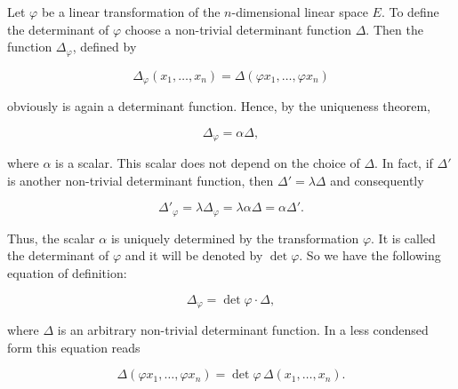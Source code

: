 Let $\varphi$ be a linear transformation of the $n$-dimensional linear space $E$. To define the determinant of $\varphi$ choose a non-trivial determinant function $\Delta$. Then the function $\Delta_\varphi$, defined by

$$\Delta_\varphi(x_1, \ldots, x_n) = \Delta(\varphi x_1, \ldots, \varphi x_n)$$

obviously is again a determinant function. Hence, by the uniqueness theorem,

$$\Delta_\varphi = \alpha \Delta,$$

where $\alpha$ is a scalar. This scalar does not depend on the choice of $\Delta$. In fact, if $\Delta'$ is another non-trivial determinant function, then $\Delta' = \lambda \Delta$ and consequently

$$\Delta'_\varphi = \lambda \Delta_\varphi = \lambda \alpha \Delta = \alpha \Delta'.$$

Thus, the scalar $\alpha$ is uniquely determined by the transformation $\varphi$. It is called the determinant of $\varphi$ and it will be denoted by $\det \varphi$. So we have the following equation of definition:

$$\Delta_\varphi = \det \varphi \cdot \Delta,$$

where $\Delta$ is an arbitrary non-trivial determinant function. In a less condensed form this equation reads

$$\Delta(\varphi x_1, \ldots, \varphi x_n) = \det \varphi \, \Delta(x_1, \ldots, x_n).$$
